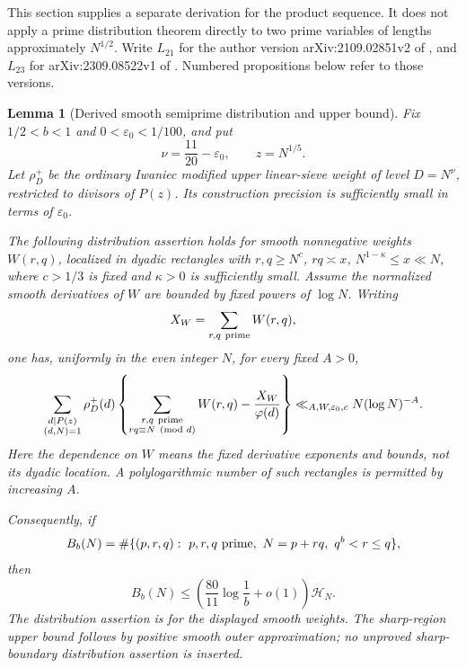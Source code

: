 \documentclass[11pt]{article}
\newtheorem{lemma}[theorem]{Lemma}
\newcommand{\HN}{\mathcal H_N}
\begin{document}
This section supplies a separate derivation for the product sequence.
It does not apply a prime distribution theorem directly to two prime
variables of lengths approximately $N^{1/2}$. Write $L_{21}$ for the
author version arXiv:2109.02851v2 of \cite{Lichtman2025}, and $L_{23}$
for arXiv:2309.08522v1 of \cite{Lichtman2023}. Numbered propositions
below refer to those versions.

\begin{lemma}[Derived smooth semiprime distribution and upper bound]
\label{lem:semiprime55}
Fix $1/2<b<1$ and $0<\varepsilon_0<1/100$, and put
\[
 \nu=\frac{11}{20}-\varepsilon_0,\qquad z=N^{1/5}.
\]
Let $\rho_D^+$ be the ordinary Iwaniec modified upper linear-sieve
weight of level $D=N^\nu$, restricted to divisors of $P(z)$.
Its construction precision is sufficiently small in terms of
$\varepsilon_0$.

The following distribution assertion holds for smooth nonnegative
weights $W(r,q)$, localized in dyadic rectangles with
$r,q\ge N^c$, $rq\asymp x$, $N^{1-\kappa}\le x\ll N$, where $c>1/3$
is fixed and $\kappa>0$ is sufficiently small. Assume the normalized
smooth derivatives of $W$ are bounded by fixed powers of $\log N$.
Writing
\[
 X_W=\sum_{r,q\ {\rm prime}}W(r,q),
\]
one has, uniformly in the even integer $N$, for every fixed $A>0$,
\begin{equation}\label{eq:smooth-semiprime-error}
 \sum_{\substack{d\mid P(z)\\(d,N)=1}}\rho_D^+(d)
 \left\{\sum_{\substack{r,q\ {\rm prime}\\rq\equiv N\pmod d}}
       W(r,q)-\frac{X_W}{\varphi(d)}\right\}
 \ll_{A,W,\varepsilon_0,c}N(\log N)^{-A}.
\end{equation}
Here the dependence on $W$ means the fixed derivative exponents and
bounds, not its dyadic location. A polylogarithmic number of such
rectangles is permitted by increasing $A$.

Consequently, if
\[
 B_b(N)=\#\{(p,r,q):\ p,r,q\ {\rm prime},\
                     N=p+rq,\ q^b<r\le q\},
\]
then
\begin{equation}\label{eq:semiprime-new-upper}
 B_b(N)\le
 \left(\frac{80}{11}\log\frac1b+o(1)\right)\HN .
\end{equation}
The distribution assertion is for the displayed smooth weights.
The sharp-region upper bound follows by positive smooth outer
approximation; no unproved sharp-boundary distribution assertion
is inserted.
\end{lemma}
\end{document}
